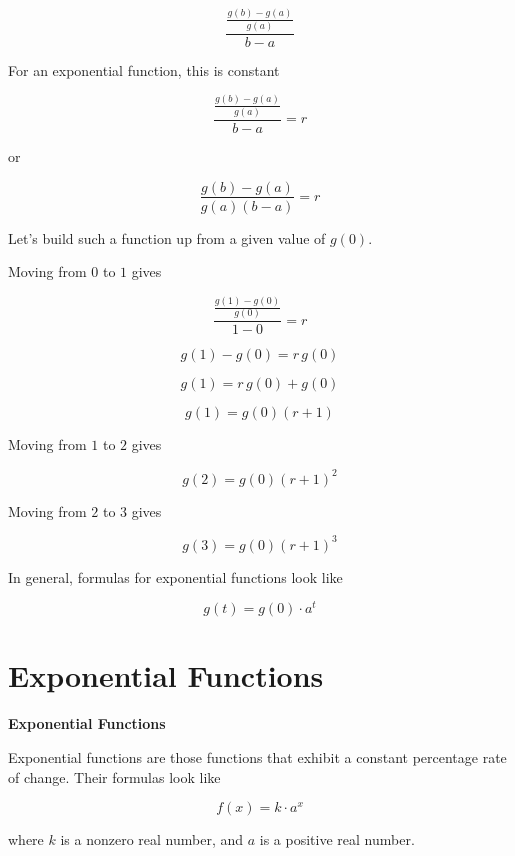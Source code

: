 \documentclass{ximera}
\begin{document}
\[      \frac{\frac{g(b)-g(a)}{g(a)}}{b-a}    \]



For an exponential function, this is constant


\[      \frac{\frac{g(b)-g(a)}{g(a)}}{b-a}  = r  \]

or

\[      \frac{g(b)-g(a)}{g(a)(b-a)}  = r  \]



Let's build such a function up from a given value of $g(0)$. 


\begin{procedure}
Moving from $0$ to $1$ gives

\[      \frac{\frac{g(1)-g(0)}{g(0)}}{1-0}  = r  \]


\[      g(1)-g(0) = r \, g(0)  \]


\[      g(1) = r \, g(0) + g(0)  \]

\[      g(1) =  g(0) (r + 1)  \]



Moving from $1$ to $2$ gives

\[      g(2) =  g(0) (r + 1)^2  \]


Moving from $2$ to $3$ gives

\[      g(3) =  g(0) (r + 1)^3  \]

\end{procedure}


In general, formulas for exponential functions look like


\[      g(t) = g(0) \cdot a^t   \]

















\section{Exponential Functions}


\begin{definition} \textbf{\textcolor{green!50!black}{Exponential Functions}}

Exponential functions are those functions that exhibit a constant percentage rate of change.  Their formulas look like


\[      f(x) = k \cdot a^x   \]

where $k$ is a nonzero real number, and $a$ is a positive real number.


\end{definition}
\end{document}

